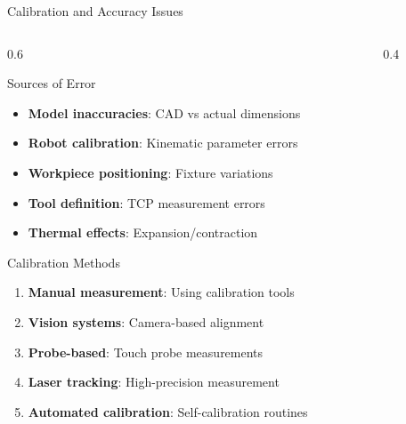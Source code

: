 \documentclass[10pt,aspectratio=169]{beamer}
\begin{document}
\begin{frame}{Calibration and Accuracy Issues}
\begin{columns}[T]
\begin{column}{0.6\textwidth}
\begin{block}{Sources of Error}
\begin{itemize}
\item \textbf{Model inaccuracies}: CAD vs actual dimensions
\item \textbf{Robot calibration}: Kinematic parameter errors
\item \textbf{Workpiece positioning}: Fixture variations
\item \textbf{Tool definition}: TCP measurement errors
\item \textbf{Thermal effects}: Expansion/contraction
\end{itemize}
\end{block}
\begin{alertblock}{Calibration Methods}
\begin{enumerate}
\item \textbf{Manual measurement}: Using calibration tools
\item \textbf{Vision systems}: Camera-based alignment
\item \textbf{Probe-based}: Touch probe measurements
\item \textbf{Laser tracking}: High-precision measurement
\item \textbf{Automated calibration}: Self-calibration routines
\end{enumerate}
\end{alertblock}
\end{column}
\begin{column}{0.4\textwidth}
\begin{center}
\end{center}
\end{column}
\end{columns}


\end{frame}
\end{document}
